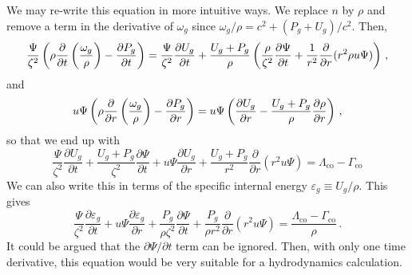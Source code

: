 \documentclass[../main.tex]{subfiles}
\begin{document}
We may re-write this equation in more intuitive ways. We replace $n$ by $\rho$ and remove a term in the derivative of $\omega_g$ since $\omega_g/\rho=c^2+(P_g+U_g)/c^2$. Then,
\begin{equation*}
    \frac{\Psi}{\zeta^2}\left(\rho\frac{\partial}{\partial t}\left(\frac{\omega_g}{\rho}\right)-\frac{\partial P_g}{\partial t}\right)=\frac{\Psi}{\zeta^2}\frac{\partial U_g}{\partial t}+\frac{U_g+P_g}{\rho}\left(\frac{\rho}{\zeta^2}\frac{\partial \Psi}{\partial t}+\frac{1}{r^2}\frac{\partial}{\partial r}(r^2\rho u\Psi)\right)\,,
\end{equation*}
and
\begin{equation*}
    u\Psi\left(\rho\frac{\partial}{\partial r}\left(\frac{\omega_g}{\rho}\right)-\frac{\partial P_g}{\partial r}\right)=u\Psi\left(\frac{\partial U_g}{\partial r}-\frac{U_g+P_g}{\rho}\frac{\partial \rho}{\partial r}\right)\,,
\end{equation*}
so that we end up with
\begin{equation}
    \frac{\Psi}{\zeta^2}\frac{\partial U_g}{\partial t}+\frac{U_g+P_g}{\zeta^2}\frac{\partial \Psi}{\partial t}+u\Psi\frac{\partial U_g}{\partial r}+\frac{U_g+P_g}{r^2}\frac{\partial}{\partial r}(r^2u\Psi)=\Lambda_\text{co}-\Gamma_\text{co}
\end{equation}
We can also write this in terms of the specific internal energy $\varepsilon_g\equiv U_g/\rho$.  This gives
\begin{equation}\label{eq:specific_internal_energy}
    \frac{\Psi}{\zeta^2}\frac{\partial \varepsilon_g}{\partial t}+u\Psi\frac{\partial \varepsilon_g}{\partial r}+\frac{P_g}{\rho\zeta^2}\frac{\partial \Psi}{\partial t}+\frac{P_g}{\rho r^2}\frac{\partial}{\partial r}(r^2u\Psi)=\frac{\Lambda_\text{co}-\Gamma_\text{co}}{\rho}\,.
\end{equation}
It could be argued that the $\partial \Psi/\partial t$ term can be ignored.  Then, with only one time derivative, this equation would be very suitable for a hydrodynamics calculation.
\end{document}
